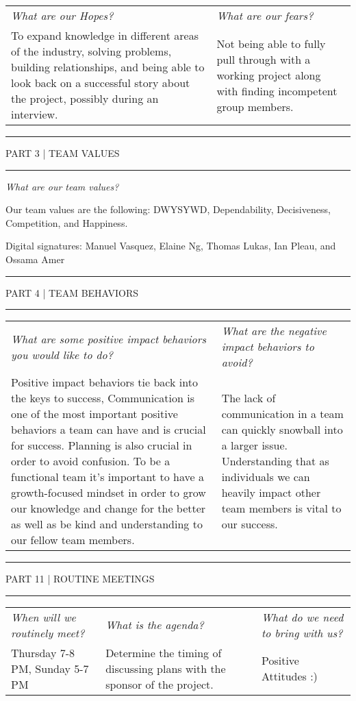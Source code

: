 \documentclass{article}
\newcommand{\makesection}[1]{\hrule\vskip1mm\uppercase{#1}\vskip1mm\hrule}
\begin{document}
\begin{tabular}{p{.475\linewidth}|p{.475\linewidth}}
    \textit{What are our Hopes?} & \textit{What are our fears?} \\
    To expand knowledge in different areas of the industry, solving problems, building relationships, and being able to look back on a successful story about the project, possibly during an interview. & Not being able to fully pull through with a working project along with finding incompetent group members.
\end{tabular}


\vspace*{.75cm}
\makesection{Part 3 | Team Values}
\vspace*{.15cm}
\centerline{
    \textit{What are our team values?}
}
\centerline{
    Our team values are the following: DWYSYWD, Dependability, Decisiveness, Competition, and Happiness.
}
\centerline{
    Digital signatures: Manuel Vasquez, Elaine Ng, Thomas Lukas, Ian Pleau, and Ossama Amer
}


\vspace*{.75cm}
\makesection{Part 4 | Team Behaviors}
\vspace*{.15cm}
\begin{tabular}{p{.475\linewidth}|p{.475\linewidth}}
    \textit{What are some positive impact behaviors you would like to do?} & \textit{What are the negative impact behaviors to avoid?} \\
    Positive impact behaviors tie back into the keys to success, Communication is one of the most important positive behaviors a team can have and is crucial for success. Planning is also crucial in order to avoid confusion. To be a functional team it's important to have a growth-focused mindset in order to grow our knowledge and change for the better as well as be kind and understanding to our fellow team members. & The lack of communication in a team can quickly snowball into a larger issue. Understanding that as individuals we can heavily impact other team members is vital to our success.
\end{tabular}


\vspace*{.75cm}
\makesection{Part 11 | Routine Meetings}
\vspace*{.15cm}
\begin{tabular}{p{.31\linewidth}|p{.31\linewidth}|p{.31\linewidth}}
    \textit{When will we routinely meet?} & \textit{What is the agenda?} & \textit{What do we need to bring with us?} \\
    Thursday 7-8 PM, Sunday 5-7 PM & Determine the timing of discussing plans with the sponsor of the project. & Positive Attitudes :)
\end{tabular}
\end{document}
